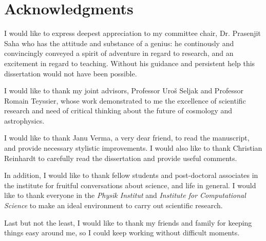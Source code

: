 {}

\chapter*{Acknowledgments}

I would like to express deepest appreciation to my committee chair,
Dr. Prasenjit Saha who has the attitude and substance of a genius: 
he continously and convincingly conveyed a spirit of adventure
in regard to research, and an excitement in regard to teaching. 
Without his guidance and persistent help this dissertation 
would not have been possible. 

I would like to thank my joint advisors, Professor Uro\v s Seljak and
Professor Romain Teyssier, whose work demonstrated to me the 
excellence of scientific research and need of critical thinking
about the future of cosmology and astrophysics.

I would like to thank Janu Verma, a very dear friend, to read 
the manuscript, and provide necessary stylistic improvements. 
I would also like to thank Christian Reinhardt to carefully
read the dissertation and provide useful comments.

In addition, I would like to thank fellow students and post-doctoral
associates in the institute for fruitful conversations about
science, and life in general. I would like to thank everyone
in the {\it Physik Institut} and {\it Institute for Computational Science}
to make an ideal environment to carry out scientific research.

Last but not the least, I would like to thank my friends and
family for keeping things easy around me, so I could 
keep working without difficult moments.


